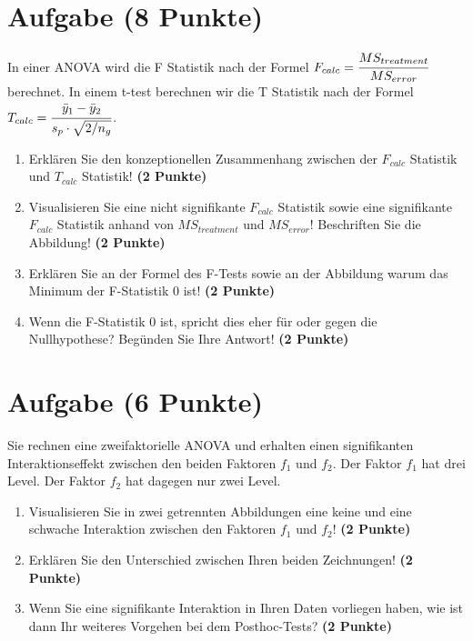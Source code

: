\documentclass[a4paper, 10pt]{scrartcl}\usepackage[]{graphicx}\usepackage[]{color}
\begin{document}
\section{Aufgabe \hfill (8 Punkte)}

In einer ANOVA wird die F Statistik nach der Formel $F_{calc} = \cfrac{MS_{treatment}}{MS_{error}}$ berechnet. In einem t-test berechnen wir die T Statistik nach der Formel $T_{calc} = \cfrac{\bar{y}_1 - \bar{y}_2}{s_p \cdot \sqrt{2/n_g}}$.

\begin{enumerate}
\item Erklären Sie den konzeptionellen Zusammenhang zwischen der $F_{calc}$ Statistik und $T_{calc}$ Statistik! \textbf{(2 Punkte)}
\item Visualisieren Sie eine nicht signifikante $F_{calc}$ Statistik sowie eine signifikante $F_{calc}$ Statistik anhand von $MS_{treatment}$ und $MS_{error}$! Beschriften Sie die Abbildung! \textbf{(2 Punkte)}
\item Erklären Sie an der Formel des F-Tests sowie an der Abbildung warum das Minimum der F-Statistik 0 ist! \textbf{(2 Punkte)}
\item Wenn die  F-Statistik 0 ist, spricht dies eher für oder gegen die Nullhypothese? Begünden Sie Ihre Antwort! \textbf{(2 Punkte)}
\end{enumerate}

 
\clearpage

\section{Aufgabe \hfill (6 Punkte)}

Sie rechnen eine zweifaktorielle ANOVA und erhalten einen signifikanten Interaktionseffekt zwischen den beiden Faktoren $f_1$ und $f_2$. Der Faktor $f_1$ hat drei Level. Der Faktor $f_2$ hat dagegen nur zwei Level.




\begin{enumerate}
\item Visualisieren Sie in zwei getrennten Abbildungen eine keine und eine schwache Interaktion zwischen den Faktoren $f_1$ und $f_2$! \textbf{(2 Punkte)}
\item Erklären Sie den Unterschied zwischen Ihren beiden Zeichnungen! \textbf{(2 Punkte)}
\item Wenn Sie eine signifikante Interaktion in Ihren Daten vorliegen haben, wie ist dann Ihr weiteres Vorgehen bei dem Posthoc-Tests? \textbf{(2 Punkte)}
\end{enumerate}
\end{document}
